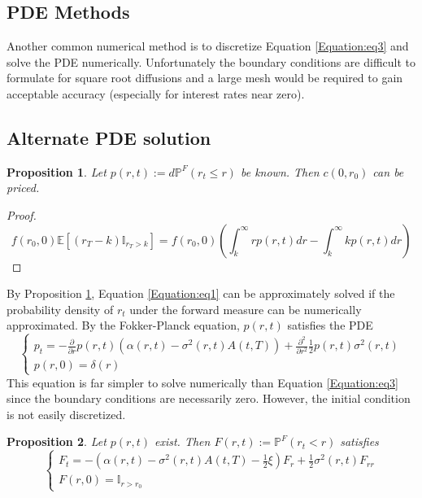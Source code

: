 \documentclass[12pt]{article}
\newtheorem{bond}{Proposition}
\theoremstyle{definition}
\theoremstyle{remark}
\begin{document}
\subsection{PDE Methods}
Another common numerical method is to discretize Equation \ref{Equation:eq3} and solve the PDE numerically.  Unfortunately the boundary conditions are difficult to formulate for square root diffusions and a large mesh would be required to gain acceptable accuracy (especially for interest rates near zero).
\subsection{Alternate PDE solution}
\begin{bond}
Let \(p(r, t) := d\mathbb{P}^F (r_t \leq r)\) be known. Then \(c(0, r_0)\) can be priced.
 \label{Proposition:prop4}
\end{bond}
\begin{proof}
\[f(r_0, 0)\mathbb{E}[(r_T-k)\mathbb{I}_{r_T > k}]=f(r_0, 0)\left(\int_ k ^\infty r p(r, t) dr-\int_k ^\infty k p(r, t) dr\right)\]
\end{proof}
By Proposition \ref{Proposition:prop4}, Equation \ref{Equation:eq1} can be approximately solved if the probability density of \(r_t\) under the forward measure can be numerically approximated.
By the Fokker-Planck equation, \(p(r, t) \) satisfies the PDE
\begin{equation} \left \{\begin{array}{rl} p_t=-\frac{\partial}{\partial r} p(r, t) \left(\alpha(r, t)-\sigma^2(r, t)A(t, T)\right)+\frac{\partial ^2}{\partial r^2} \frac{1}{2}p(r, t)\sigma^2 (r, t) \\
p(r, 0)=\delta(r)
\end{array}
\right.
\end{equation}
This equation is far simpler to solve numerically than Equation \ref{Equation:eq3} since the boundary conditions are necessarily zero.  However, the initial condition is not easily discretized.
\begin{bond}
Let \(p(r, t)\) exist.  Then
\(F(r, t):= \mathbb{P} ^F (r_t <r) \) satisfies 
\begin{equation} \left \{ \begin{array}{rl} 
F_t=-\left(\alpha(r, t)-\sigma^2(r, t)A(t, T)-\frac{1}{2} \xi \right) F_r +\frac{1}{2} \sigma^2 (r, t) F_{rr} \\
F(r, 0)=\mathbb{I}_{r>r_0}
\end{array} 
\right.
\label{Equation:eq7}
\end{equation}
\label{Proposition:prop6}
\end{bond}
\end{document}
